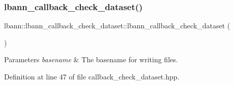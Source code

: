 \subsubsection{\texorpdfstring{lbann\+\_\+callback\+\_\+check\+\_\+dataset()}{lbann\_callback\_check\_dataset()}\hspace{0.1cm}{\footnotesize\ttfamily [1/2]}}
{\footnotesize\ttfamily lbann\+::lbann\+\_\+callback\+\_\+check\+\_\+dataset\+::lbann\+\_\+callback\+\_\+check\+\_\+dataset (\begin{DoxyParamCaption}{ }\end{DoxyParamCaption})\hspace{0.3cm}{\ttfamily [inline]}}


\begin{DoxyParams}{Parameters}
{\em basename} & The basename for writing files. \\
\hline
\end{DoxyParams}


Definition at line 47 of file callback\+\_\+check\+\_\+dataset.\+hpp.


